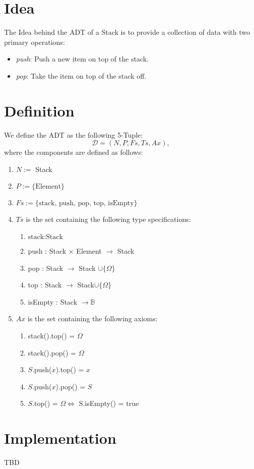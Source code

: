 \documentclass{article}
\begin{document}
\section*{Idea}
The Idea behind the ADT of a Stack is to provide a collection of data with two primary operations:

\begin{itemize}
	\item \emph{push}: Push a new item on top of the stack.
	\item \emph{pop}: Take the item on top of the stack off.
\end{itemize}


\section*{Definition}

We define the ADT as the following 5-Tuple:
\[\mathcal{D} = (N, P, Fs, Ts, Ax),\]
where the components are defined as follows:

\begin{enumerate}
 \item \(N :=\) Stack
 \item \(P := \{ \text{Element} \}\)
 \item \(Fs := \{ \text{stack, push, pop, top, isEmpty} \}\)
 \item \(Ts\) is the set containing the following type specifications:
	\begin{enumerate}
		\item \( \text{stack} : \text{Stack} \)
		\item push : Stack \(\times\) Element \(\rightarrow\) Stack
		\item pop : Stack \(\rightarrow\) Stack \(\cup \{\Omega\}\)
		\item top : Stack \(\rightarrow\) Stack\(\cup \{\Omega\}\)
		\item isEmpty : Stack \(\rightarrow \mathbb{B}\)
	\end{enumerate}
 \item \(Ax\) is the set containing the following axioms:
	\begin{enumerate}
		\item stack().top() = \(\Omega\)
		\item stack().pop() = \(\Omega\)
		\item \(S\).push(\(x\)).top() = \(x\)
		\item \(S\).push(\(x\)).pop() = \(S\)
		\item \(S\).top() = \(\Omega \iff\) S.isEmpty() = true
	\end{enumerate}
\end{enumerate}


\section*{Implementation}
TBD
\end{document}
